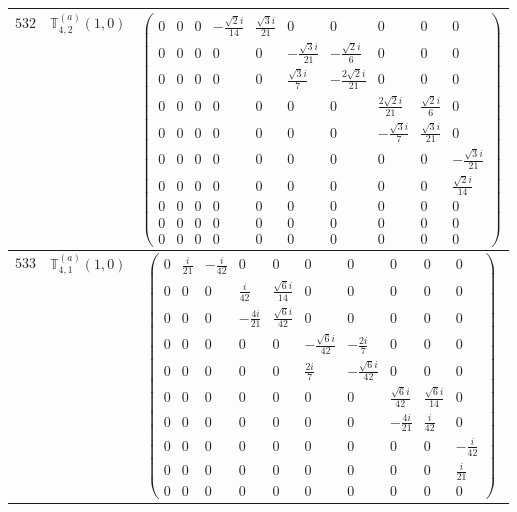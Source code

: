 \documentclass[fleqn,8pt,landscape]{jsarticle}
\begin{document}
\begin{center}
\begin{longtable}{ccc}
$ 532 $ & $ \mathbb{T}_{4,2}^{(a)}(1,0) $ & $ \begin{pmatrix} 0 & 0 & 0 & - \frac{\sqrt{2} i}{14} & \frac{\sqrt{3} i}{21} & 0 & 0 & 0 & 0 & 0 \\ 0 & 0 & 0 & 0 & 0 & - \frac{\sqrt{3} i}{21} & - \frac{\sqrt{2} i}{6} & 0 & 0 & 0 \\ 0 & 0 & 0 & 0 & 0 & \frac{\sqrt{3} i}{7} & - \frac{2 \sqrt{2} i}{21} & 0 & 0 & 0 \\ 0 & 0 & 0 & 0 & 0 & 0 & 0 & \frac{2 \sqrt{2} i}{21} & \frac{\sqrt{2} i}{6} & 0 \\ 0 & 0 & 0 & 0 & 0 & 0 & 0 & - \frac{\sqrt{3} i}{7} & \frac{\sqrt{3} i}{21} & 0 \\ 0 & 0 & 0 & 0 & 0 & 0 & 0 & 0 & 0 & - \frac{\sqrt{3} i}{21} \\ 0 & 0 & 0 & 0 & 0 & 0 & 0 & 0 & 0 & \frac{\sqrt{2} i}{14} \\ 0 & 0 & 0 & 0 & 0 & 0 & 0 & 0 & 0 & 0 \\ 0 & 0 & 0 & 0 & 0 & 0 & 0 & 0 & 0 & 0 \\ 0 & 0 & 0 & 0 & 0 & 0 & 0 & 0 & 0 & 0 \end{pmatrix} $ \\ \hline
$ 533 $ & $ \mathbb{T}_{4,1}^{(a)}(1,0) $ & $ \begin{pmatrix} 0 & \frac{i}{21} & - \frac{i}{42} & 0 & 0 & 0 & 0 & 0 & 0 & 0 \\ 0 & 0 & 0 & \frac{i}{42} & \frac{\sqrt{6} i}{14} & 0 & 0 & 0 & 0 & 0 \\ 0 & 0 & 0 & - \frac{4 i}{21} & \frac{\sqrt{6} i}{42} & 0 & 0 & 0 & 0 & 0 \\ 0 & 0 & 0 & 0 & 0 & - \frac{\sqrt{6} i}{42} & - \frac{2 i}{7} & 0 & 0 & 0 \\ 0 & 0 & 0 & 0 & 0 & \frac{2 i}{7} & - \frac{\sqrt{6} i}{42} & 0 & 0 & 0 \\ 0 & 0 & 0 & 0 & 0 & 0 & 0 & \frac{\sqrt{6} i}{42} & \frac{\sqrt{6} i}{14} & 0 \\ 0 & 0 & 0 & 0 & 0 & 0 & 0 & - \frac{4 i}{21} & \frac{i}{42} & 0 \\ 0 & 0 & 0 & 0 & 0 & 0 & 0 & 0 & 0 & - \frac{i}{42} \\ 0 & 0 & 0 & 0 & 0 & 0 & 0 & 0 & 0 & \frac{i}{21} \\ 0 & 0 & 0 & 0 & 0 & 0 & 0 & 0 & 0 & 0 \end{pmatrix} $ \\ \hline

\end{longtable}
\end{center}
\end{document}
